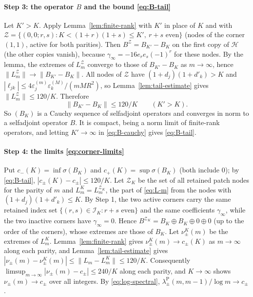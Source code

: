 \documentclass[preprint,12pt,a4paper]{elsarticle}
\theoremstyle{remark}
\newcommand{\Pa}{\mathrm P}
\begin{document}
\paragraph{Step 3: the operator $B$ and the bound \eqref{eq:B-tail}}
Let $K'>K$. Apply Lemma~\ref{lem:finite-rank} with $K'$ in place of $K$ and
with $\mathcal Z=\{(0,0;r,s):K<(1+r)(1+s)\le K',\ r+s\text{ even}\}$ (nodes of the
corner $(1,1)$, active for both parities). Then $B^{\mathcal Z}=B_{K'}-B_K$ on the
first copy of $\mathcal H$ (the other copies vanish), because
$\gamma_\infty=-16e_re_s(-1)^r$ for these nodes. By the lemma, the extremes of
$L^{\mathcal Z}_m$ converge to those of $B_{K'}-B_K$ as $m\to\infty$, hence
$\|L^{\mathcal Z}_m\|\to\|B_{K'}-B_K\|$. All nodes of $\mathcal Z$ have
$(1+d_j)(1+d'_k)>K$ and $|\ell_{jk}|\le4\varepsilon^{(m)}_j\varepsilon^{(M)}_k/(mMR^2)$, so
Lemma~\ref{lem:tail-estimate} gives $\|L^{\mathcal Z}_m\|\le120/K$. Therefore
\begin{equation}\label{eq:B-cauchy}
 \|B_{K'}-B_K\|\le120/K\qquad(K'>K).
\end{equation}
So $(B_K)$ is a Cauchy sequence of selfadjoint operators and converges in norm to a
selfadjoint operator $B$. It is compact, being a norm limit of finite-rank operators,
and letting $K'\to\infty$ in \eqref{eq:B-cauchy} gives \eqref{eq:B-tail}.

\paragraph{Step 4: the limits \eqref{eq:corner-limits}}
Put $c_-(K)=\inf\sigma(B_K)$ and $c_+(K)=\sup\sigma(B_K)$ (both include $0$);
by \eqref{eq:B-tail}, $|c_\pm(K)-c_\pm|\le120/K$. Let $\mathcal Z_K$ be the set of
all retained patch nodes for the parity of $m$ and $L_m^K=L_m^{\mathcal Z_K}$, the part of
\eqref{eq:L-m} from the nodes with $(1+d_j)(1+d'_k)\le K$. By Step 1, the two
active corners carry the same retained index set
$\{(r,s)\in \mathcal I_K:r+s\text{ even}\}$ and the same coefficients $\gamma_\infty$, while
the two inactive corners have $\gamma_\infty=0$. Hence
$B^{\mathcal Z_K}=B_K\oplus B_K\oplus0\oplus0$ (up to the order of the corners),
whose extremes are those of $B_K$. Let $\nu^K_\pm(m)$ be the extremes of
$L_m^K$. Lemma~\ref{lem:finite-rank} gives
$\nu^K_\pm(m)\to c_\pm(K)$ as $m\to\infty$ along each parity, and
Lemma~\ref{lem:tail-estimate} gives
$|\nu_\pm(m)-\nu^K_\pm(m)|\le\|L_m-L_m^K\|\le120/K$. Consequently
$\limsup_{m\to\infty}|\nu_\pm(m)-c_\pm|\le240/K$ along each parity, and
$K\to\infty$ shows $\nu_\pm(m)\to c_\pm$ over all integers. By
\eqref{eq:log-spectral}, $\lambda^\Pa_\pm(m,m-1)/\log m\to c_\pm$.
\end{document}
